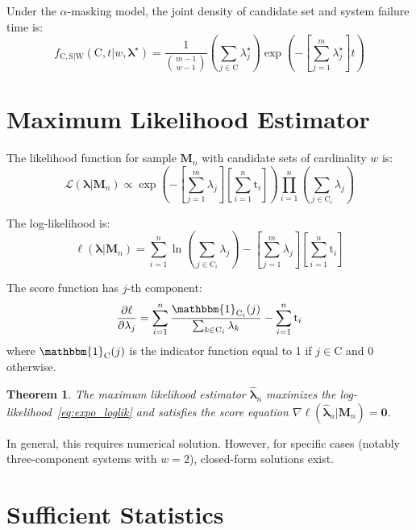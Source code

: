 \documentclass[12pt]{article}
\newcommand{\RV}[1]{\mathrm{#1}}
\newcommand{\sv}{\RV{S}}           %
\newcommand{\cand}{\RV{C}}         %
\newcommand{\rvcand}{\RV{C}}       %
\newcommand{\ti}{\mathrm{t}}       %
\newcommand{\tparam}[1]{{#1}^{\star}}  %
\newcommand{\expomle}{\boldsymbol{\hat{\lambda}}_n}
\newcommand{\likelihood}{\mathcal{L}}
\newcommand{\mfs}{\mathbf{M}_n}
\newcommand{\pdf}{f}
\renewcommand{\vec}[1]{\boldsymbol{#1}}
\newtheorem{theorem}{Theorem}[section]
\theoremstyle{definition}
\begin{document}
Under the $\alpha$-masking model, the joint density of candidate set and system failure time is:
\begin{equation}
\label{eq:expo_masked_joint}
\pdf_{\rvcand, \sv | \RV{W}}(\cand, t | w, \tparam{\vec{\lambda}}) = \frac{1}{\binom{m-1}{w-1}} \left(\sum_{j \in \cand} \tparam{\lambda}_j\right) \exp\left(-\left[\sum_{j=1}^{m} \tparam{\lambda}_j\right] t\right)
\end{equation}

\section{Maximum Likelihood Estimator}

The likelihood function for sample $\mfs$ with candidate sets of cardinality $w$ is:
\begin{equation}
\label{eq:expo_likelihood}
\likelihood(\vec{\lambda} | \mfs) \propto \exp\left(-\left[\sum_{j=1}^{m} \lambda_j\right] \left[\sum_{i=1}^{n} \ti_i\right]\right) \prod_{i=1}^{n} \left(\sum_{j \in \cand_i} \lambda_j\right)
\end{equation}

The log-likelihood is:
\begin{equation}
\label{eq:expo_loglik}
\ell(\vec{\lambda} | \mfs) = \sum_{i=1}^{n} \ln\left(\sum_{j \in \cand_i} \lambda_j\right) - \left[\sum_{j=1}^{m} \lambda_j\right] \left[\sum_{i=1}^{n} \ti_i\right]
\end{equation}

The score function has $j$-th component:
\begin{equation}
\label{eq:expo_score}
\frac{\partial \ell}{\partial \lambda_j} = \sum_{i=1}^{n} \frac{\mathbbm{1}_{\cand_i}(j)}{\sum_{k \in \cand_i} \lambda_k} - \sum_{i=1}^{n} \ti_i
\end{equation}
where $\mathbbm{1}_{\cand}(j)$ is the indicator function equal to 1 if $j \in \cand$ and 0 otherwise.

\begin{theorem}
The maximum likelihood estimator $\expomle$ maximizes the log-likelihood~\eqref{eq:expo_loglik} and satisfies the score equation $\nabla \ell(\expomle | \mfs) = \vec{0}$.
\end{theorem}

In general, this requires numerical solution. However, for specific cases (notably three-component systems with $w=2$), closed-form solutions exist.

\section{Sufficient Statistics}
\end{document}
